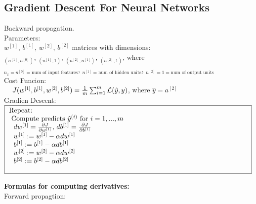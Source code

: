 \documentclass{article}
\begin{document}
\newpage
\subsection{Gradient Descent For Neural Networks}

Backward propagation.\\

Parameters:\\

$w^{[1]}$, $b^{[1]}$, $w^{[2]}$, $b^{[2]}$ matrices with dimensions:\\

$_{(n^{[1]}, n^{[0]})}$, $_{(n^{[1]}, 1)}$, $_{(n^{[2]}, n^{[1]})}$, $_{(n^{[2]}, 1)}$, where \\

$_{n_x = n^{[0]}=\text{num of input features}}$, $_{n^{[1]}= \text{num of hidden units}}$, $_{n^{[2]}=1=\text{num of output units}}$\\

Cost Funcion:\\

$\hspace{4mm} J(w^{[1]}, b^{[1]}, w^{[2]}, b^{[2]}) = \frac{1}{m} \sum_{i=1}^m \mathcal{L}(\hat{y}, y)$, where $\hat{y}=a^{[2]}$\\


Gradien Descent:\\

$\noindent\fbox{
\parbox{\textwidth}{

Repeat:\\
$\indent$ Compute predicts ${\hat{y}}^{(i)}$ for $i=1,...,m$\\
$\indent$ $\indent$ $dw^{[1]} = \frac{\partial J}{\partial w^{[1]}}$, $db^{[1]} = \frac{\partial J}{\partial b^{[1]}}$\\
$\indent$ $\indent$ $w^{[1]} := w^{[1]} -\alpha dw^{[1]}$\\
$\indent$ $\indent$ $b^{[1]} := b^{[1]} -\alpha db^{[1]}$\\
$\indent$ $\indent$ $w^{[2]} := w^{[2]} -\alpha dw^{[2]}$\\
$\indent$ $\indent$ $b^{[2]} := b^{[2]} -\alpha db^{[2]}$\\

}
}$\\

\newpage

\textbf{Formulas for computing derivatives:}\\

Forward propagtion:\\
\end{document}
